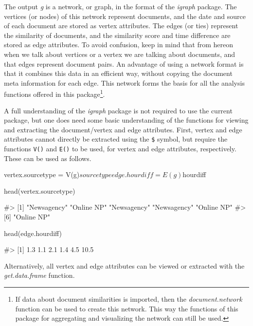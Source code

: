 The output \emph{g} is a network, or graph, in the format of the
\emph{igraph} package. The vertices (or nodes) of this network represent
documents, and the date and source of each document are stored as vertex
attributes. The edges (or ties) represent the similarity of documents,
and the similarity score and time difference are stored as edge
attributes. To avoid confusion, keep in mind that from hereon when we
talk about vertices or a vertex we are talking about documents, and that
edges represent document pairs. An advantage of using a network format
is that it combines this data in an efficient way, without copying the
document meta information for each edge. This network forms the basis
for all the analysis functions offered in this package\footnote{If data
  about document similarities is imported, then the
  \emph{document.network} function can be used to create this network.
  This way the functions of this package for aggregating and visualizing
  the network can still be used.}.

A full understanding of the \emph{igraph} package is not required to use
the current package, but one does need some basic understanding of the
functions for viewing and extracting the document/vertex and edge
attributes. First, vertex and edge attributes cannot directly be
extracted using the \texttt{\$} symbol, but require the functions
\texttt{V()} and \texttt{E()} to be used, for vertex and edge
attributes, respectively. These can be used as follows.

\begin{Schunk}
\begin{Sinput}
vertex.sourcetype = V(g)$sourcetype
edge.hourdiff = E(g)$hourdiff

head(vertex.sourcetype)
\end{Sinput}
\begin{Soutput}
#> [1] "Newsagency" "Online NP"  "Newsagency" "Newsagency" "Online NP" 
#> [6] "Online NP"
\end{Soutput}
\begin{Sinput}
head(edge.hourdiff)
\end{Sinput}
\begin{Soutput}
#> [1]  1.3  1.1  2.1  1.4  4.5 10.5
\end{Soutput}
\end{Schunk}

Alternatively, all vertex and edge attributes can be viewed or extracted
with the \emph{get.data.frame} function.

